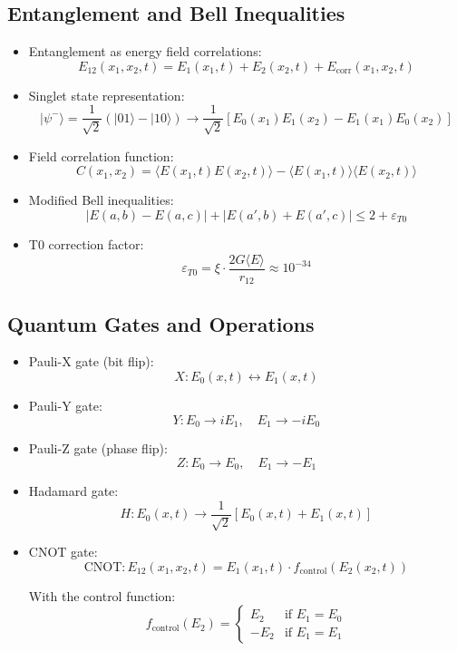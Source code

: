 \documentclass[12pt,a4paper]{article}
\begin{document}
	\subsection{Entanglement and Bell Inequalities}
	\begin{itemize}
		\item Entanglement as energy field correlations:
		$$E_{12}(x_1,x_2,t) = E_1(x_1,t) + E_2(x_2,t) + E_{\text{corr}}(x_1,x_2,t)$$
		
		\item Singlet state representation:
		$$|\psi^-\rangle = \frac{1}{\sqrt{2}}(|01\rangle - |10\rangle) \rightarrow \frac{1}{\sqrt{2}}[E_0(x_1)E_1(x_2) - E_1(x_1)E_0(x_2)]$$
		
		\item Field correlation function:
		$$C(x_1,x_2) = \langle E(x_1,t) E(x_2,t) \rangle - \langle E(x_1,t) \rangle \langle E(x_2,t) \rangle$$
		
		\item Modified Bell inequalities:
		$$|E(a,b) - E(a,c)| + |E(a',b) + E(a',c)| \leq 2 + \varepsilon_{T0}$$
		
		\item T0 correction factor:
		$$\varepsilon_{T0} = \xi \cdot \frac{2G\langle E \rangle}{r_{12}} \approx 10^{-34}$$
	\end{itemize}
	
	\subsection{Quantum Gates and Operations}
	\begin{itemize}
		\item Pauli-X gate (bit flip):
		$$X: E_0(x,t) \leftrightarrow E_1(x,t)$$
		
		\item Pauli-Y gate:
		$$Y: E_0 \rightarrow iE_1, \quad E_1 \rightarrow -iE_0$$
		
		\item Pauli-Z gate (phase flip):
		$$Z: E_0 \rightarrow E_0, \quad E_1 \rightarrow -E_1$$
		
		\item Hadamard gate:
		$$H: E_0(x,t) \rightarrow \frac{1}{\sqrt{2}}[E_0(x,t) + E_1(x,t)]$$
		
		\item CNOT gate:
		$$\text{CNOT}: E_{12}(x_1,x_2,t) = E_1(x_1,t) \cdot f_{\text{control}}(E_2(x_2,t))$$
		
		With the control function:
		$$f_{\text{control}}(E_2) = \begin{cases}
			E_2 & \text{if } E_1 = E_0 \\
			-E_2 & \text{if } E_1 = E_1
		\end{cases}$$
	\end{itemize}
	
\end{document}
